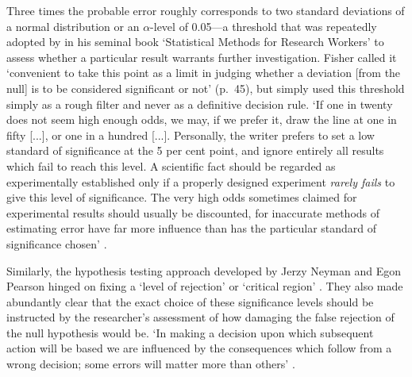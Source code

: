 Three times the probable error roughly corresponds to two standard deviations of a normal distribution or an $\alpha$-level of 0.05---a threshold that was repeatedly adopted by \citet{fisher_statistical_1925} in his seminal book `Statistical Methods for Research Workers' to assess whether a particular result warrants further investigation. Fisher called it `convenient to take this point as a limit in judging whether a deviation [from the null] is to be considered significant or not' (p.~45), but simply used this threshold simply as a rough filter and never as a definitive decision rule. `If one in twenty does not seem high enough odds, we may, if we prefer it, draw the line at one in fifty [...], or one in a hundred [...]. Personally, the writer prefers to set a low standard of significance at the 5 per cent point, and ignore entirely all results which fail to reach this level. A scientific fact should be regarded as experimentally established only if a properly designed experiment \textit{rarely fails} to give this level of significance. The very high odds sometimes claimed for experimental results should usually be discounted, for inaccurate methods of estimating error have far more influence than has the particular standard of significance chosen' \citep[p.~85--86]{fisher_arrangements_1926}.\par

Similarly, the hypothesis testing approach developed by Jerzy Neyman and Egon Pearson hinged on fixing a `level of rejection' \citep{neyman_testing_1933} or `critical region' \citep{neyman_problem_1933}. They also made abundantly clear that the exact choice of these significance levels should be instructed by the researcher's assessment of how damaging the false rejection of the null hypothesis would be. `In making a decision upon which subsequent action will be based we are influenced by the consequences which follow from a wrong decision; some errors will matter more than others' \citep[p.~509]{neyman_testing_1933}.

